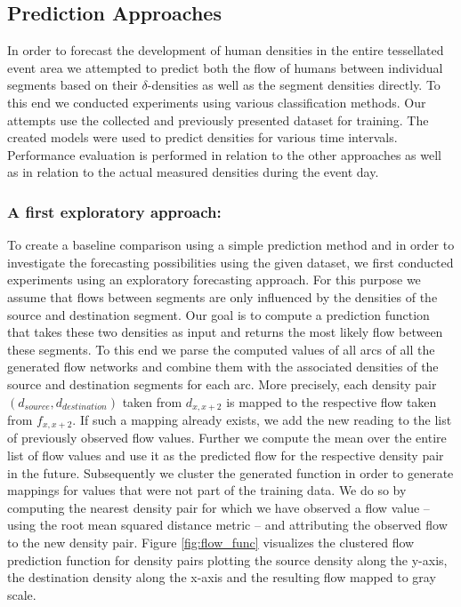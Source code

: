 \documentclass[12pt,a4paper,twoside,openright]{book}
\begin{document}
\subsection{Prediction Approaches}
\label{subsec:predicting-human-crowd-densities}

In order to forecast the development of human densities in the entire tessellated event area we attempted to predict both the flow of humans between individual segments based on their $\delta$-densities as well as the segment densities directly.
%
To this end we conducted experiments using various classification methods.
%
Our attempts use the collected and previously presented dataset for training.
%
The created models were used to predict densities for various time intervals.
%
Performance evaluation is performed in relation to the other approaches as well as in relation to the actual measured densities during the event day.

\subsubsection{A first exploratory approach:}
\label{subsubsec:naive-exploratory-approach}

To create a baseline comparison using a simple prediction method and in order to investigate the forecasting possibilities using the given dataset, we first conducted experiments using an exploratory forecasting approach.
%
For this purpose we assume that flows between segments are only influenced by the densities of the source and destination segment.
%
Our goal is to compute a prediction function that takes these two densities as input and returns the most likely flow between these segments.
%
To this end we parse the computed values of all arcs of all the generated flow networks and combine them with the associated densities of the source and destination segments for each arc.
%
More precisely, each density pair $(d_{source}, d_{destination})$ taken from $d_{x,x+2}$ is mapped to the respective flow taken from $f_{x,x+2}$.
%
If such a mapping already exists, we add the new reading to the list of previously observed flow values.
%
Further we compute the mean over the entire list of flow values and use it as the predicted flow for the respective density pair in the future.
%
Subsequently we cluster the generated function in order to generate mappings for values that were not part of the training data.
%
We do so by computing the nearest density pair for which we have observed a flow value -- using the root mean squared distance metric -- and attributing the observed flow to the new density pair.
%
Figure \ref{fig:flow_func} visualizes the clustered flow prediction function for density pairs plotting the source density along the y-axis, the destination density along the x-axis and the resulting flow mapped to gray scale.
\end{document}
